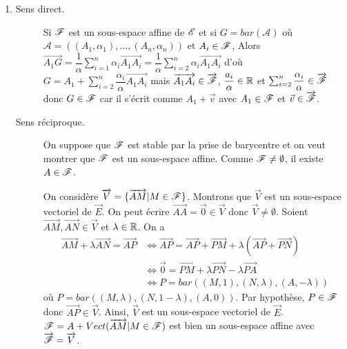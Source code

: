\documentclass[a4paper, 12pt]{article}
\begin{document}
\begin{demonstration}
    \begin{enumerate}
        \item 
        \begin{description}
            \item[Sens direct.] 
            Si $\mathscr{F}$ est un sous-espace affine de $\mathscr{E}$ et si $G = bar(\mathcal{A})$ où $\mathcal{A} = ((A_1, \alpha_1), \ldots, (A_n, \alpha_n))$ et $A_i \in \mathscr{F}$,
            Alors $\overrightarrow{A_1 G} = \dfrac{1}{\alpha} \sum_{i=1}^n \alpha_i \overrightarrow{A_1 A_i} = \dfrac{1}{\alpha} \sum_{i=2}^n \alpha_i \overrightarrow{A_1 A_i}$
            d'où $G = A_1 + \sum_{i=2}^n \dfrac{\alpha_i}{\alpha} \overrightarrow{A_1 A_i}$ mais $\overrightarrow{A_1 A_i} \in \overrightarrow{\mathscr{F}}$, $\dfrac{a_i}{\alpha} \in \mathbb{R}$
            et $\sum_{i=2}^n \dfrac{\alpha_i}{\alpha} \in \overrightarrow{\mathscr{F}}$ donc $G \in \mathscr{F}$ car il s'écrit comme $A_1 + \vec{v}$ avec $A_1 \in \mathscr{F}$ et $\vec{v} \in \overrightarrow{\mathscr{F}}$.
            \item[Sens réciproque.]
            On suppose que $\mathscr{F}$ est stable par la prise de barycentre et on veut montrer que $\mathscr{F}$ est un sous-espace affine.
            Comme $\mathscr{F} \neq \emptyset$, il existe $A \in \mathscr{F}$.

            On considère $\overrightarrow{V} = \{ \overrightarrow{AM} | M \in \mathscr{F} \}$. Montrons que $\overrightarrow{V}$ est un sous-espace vectoriel de $\overrightarrow{E}$.
            On peut écrire $\overrightarrow{AA} = \overrightarrow{0} \in \overrightarrow{V}$ donc $\overrightarrow{V} \neq \emptyset$.
            Soient $\overrightarrow{AM}, \overrightarrow{AN} \in \overrightarrow{V}$ et $\lambda\in \mathbb{R}$.
            On a 
            \begin{align*}
                \overrightarrow{AM} + \lambda \overrightarrow{AN} = \overrightarrow{AP} &\iff \overrightarrow{AP} = \overrightarrow{AP} + \overrightarrow{PM} + \lambda (\overrightarrow{AP} + \overrightarrow{PN}) \\
                &\iff \vec{0} = \overrightarrow{PM} + \lambda \overrightarrow{PN} - \lambda \overrightarrow{PA} \\
                &\iff P = bar((M, 1), (N, \lambda), (A, -\lambda))
            \end{align*}
            où $P = bar((M, \lambda), (N, 1 - \lambda), (A, 0))$.
            Par hypothèse, $P \in \mathscr{F}$ donc $\overrightarrow{AP} \in \overrightarrow{V}$.
            Ainsi, $\overrightarrow{V}$ est un sous-espace vectoriel de $\overrightarrow{E}$.
            $\mathscr{F} = A + Vect(\overrightarrow{AM} | M \in \mathscr{F})$ est bien un sous-espace affine avec $\overrightarrow{\mathscr{F}} = \overrightarrow{V}$.
        \end{description}
    \end{enumerate}
\end{demonstration}
\end{document}
